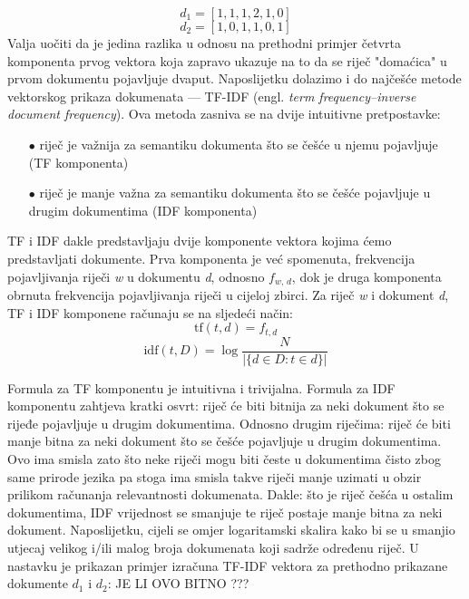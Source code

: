\documentclass[times, utf8, zavrsni]{fer}
\begin{document}
\begin{equation}
{{d_{1}}=[1, 1, 1, 2, 1, 0]}
\end{equation}
\begin{equation}
{{d_{2}}=[1, 0, 1, 1, 0, 1]}
\end{equation}
Valja uočiti da je jedina razlika u odnosu na prethodni primjer četvrta komponenta prvog vektora koja zapravo ukazuje na to da se riječ "domaćica" u prvom dokumentu pojavljuje dvaput.
Naposlijetku dolazimo i do najčešće metode vektorskog prikaza dokumenata — TF-IDF (engl. \textit{term frequency–inverse document frequency}). Ova metoda zasniva se na dvije intuitivne pretpostavke:
\begin{itemize}
\item[$\bullet$] riječ je važnija za semantiku dokumenta što se češće u njemu pojavljuje (TF komponenta)
\item[$\bullet$] riječ je manje važna za semantiku dokumenta što se češće pojavljuje u drugim dokumentima (IDF komponenta)
\end{itemize}
TF i IDF dakle predstavljaju dvije komponente vektora kojima ćemo predstavljati dokumente. Prva komponenta je već spomenuta, frekvencija pojavljivanja riječi \textit{w} u dokumentu \textit{d}, odnosno $f_\textit{w, d}$, dok je druga komponenta obrnuta frekvencija pojavljivanja riječi u cijeloj zbirci.
Za riječ \textit{w} i dokument \textit{d}, TF i IDF komponene računaju se na sljedeći način:
\begin{equation}
{\displaystyle \mathrm {tf} (t,d)=f_{t,d}}
\end{equation}
\begin{equation}
{\displaystyle \mathrm {idf} (t,D)=\log {\frac {N}{|\{d\in D:t\in d\}|}}}
\end{equation}

Formula za TF komponentu je intuitivna i trivijalna. Formula za IDF komponentu zahtjeva kratki osvrt: riječ će biti bitnija za neki dokument što se rijeđe pojavljuje u drugim dokumentima. Odnosno drugim riječima: riječ će biti manje bitna za neki dokument što se češće pojavljuje u drugim dokumentima. Ovo ima smisla zato što neke riječi mogu biti česte u dokumentima čisto zbog same prirode jezika pa stoga ima smisla takve riječi manje uzimati u obzir prilikom računanja relevantnosti dokumenata. Dakle: što je riječ češća u ostalim dokumentima, IDF vrijednost se smanjuje te riječ postaje manje bitna za neki dokument. Naposlijetku, cijeli se omjer logaritamski skalira kako bi se u smanjio utjecaj velikog i/ili malog broja dokumenata koji sadrže određenu riječ. U nastavku je prikazan primjer izračuna TF-IDF vektora za prethodno prikazane dokumente ${d_1}$ i ${d_2}$: JE LI OVO BITNO ???
\end{document}
